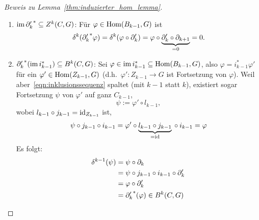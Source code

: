\begin{proof}[Beweis zu Lemma~\ref{thm:induzierter_hom_lemma}]
  \begin{enumerate}
    \item 
      $\operatorname{im} {\partial'_k}^* \subseteq Z^k(C,G)$:
      Für $\varphi \in \mathrm{Hom}(B_{k-1},G)$ ist
      \begin{equation*}
        \delta^k({\partial'_k}^* \varphi) = \delta^k(\varphi \circ \partial'_k) = \varphi \circ \underbrace{\partial'_k \circ \partial_{k+1}}_{=0} = 0.
      \end{equation*}
    \item
      ${\partial'_k}^* (\operatorname{im} i_{k-1}^*) \subseteq B^k(C,G)$:
        Sei $\varphi \in \operatorname{im} i_{k-1}^* \subseteq \mathrm{Hom}(B_{k-1},G)$, also $\varphi = i_{k-1}^* \varphi'$ für ein $\varphi' \in \mathrm{Hom}(Z_{k-1},G)$ (d.h.\ $\varphi'\colon Z_{k-1} \to G$ ist Fortsetzung von $\varphi$).
        Weil aber~\eqref{eqn:inklusionssequenz} spaltet (mit $k-1$ statt $k$), existiert sogar Fortsetzung $\psi$ von $\varphi'$ auf ganz $C_{k-1}$,
        \begin{equation*}
          \psi := \varphi' \circ l_{k-1},
        \end{equation*}
        wobei $l_{k-1} \circ j_{k-1} = \operatorname{id}_{Z_{k-1}}$ ist,
        \begin{equation*}
          \psi \circ j_{k-1} \circ i_{k-1} = \varphi' \circ \underbrace{l_{k-1} \circ j_{k-1}}_{=\operatorname{id}} {}\circ i_{k-1} = \varphi
        \end{equation*}
        Es folgt:
        \begin{align*}
          \delta^{k-1} (\psi)
            & = \psi \circ \partial_k\\
            & = \psi \circ j_{k-1} \circ i_{k-1} \circ \partial'_k\\
            & = \varphi \circ \partial'_k\\
            & = {\partial'_k}^* (\varphi) \in B^k(C,G)
        \end{align*}
  \end{enumerate}
\end{proof}
